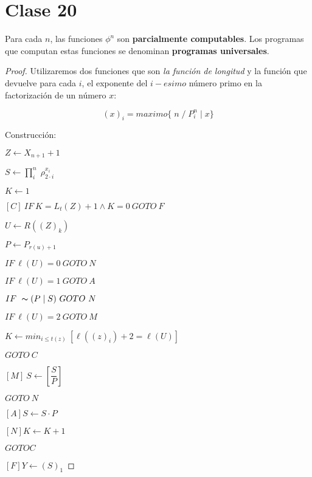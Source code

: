 \section{Clase 20}
 
\begin{theorem}
Para cada $n$, las funciones $\phi^n$ son \textbf{parcialmente computables}. Los programas que computan estas funciones se denominan \textbf{programas universales}.
\end{theorem}
 
\begin{proof}
Utilizaremos dos funciones que son \textit{la funci\'on de longitud} y la funci\'on que devuelve para cada $i$, el exponente del $i-esimo$ n\'umero primo en la factorizaci\'on de un n\'umero $x$:
 
\[
(x)_i = maximo \{ \; n \; / \; P_{i}^{n} \mid x \}
\]
 
Construcci\'on:
 
$Z \leftarrow X_{n + 1} + 1$
 
$S \leftarrow \prod_{i}^{n} \; \rho_{2 \cdot i}^{x_i}$
 
$K \leftarrow 1$
 
$[C]\ IF \ K = L_{t}(Z) + 1 \wedge K = 0 \ GOTO \ F$
 
$U \leftarrow R((Z)_{k})$
 
$P \leftarrow P_{r(u) + 1}$
 
$IF \ \ell(U) = 0 \ GOTO \ N$
 
$IF \ \ell(U) = 1 \ GOTO \ A$
 
$IF \ \thicksim(P \mid S) \ GOTO \ N$
 
$IF \ \ell(U) = 2 \ GOTO \ M$
 
$K \leftarrow min_{i \leq t(z)}\ [\ell((z)_i) + 2 = \ell(U)]$
 
$GOTO \ C$
 
$[M] \ S \leftarrow \left[\dfrac{S}{P}\right]$
 
$GOTO \ N$
 
$[A] S \leftarrow S \cdot P$
 
$[N] K \leftarrow K + 1$
 
$GOTO C$
 
$[F] Y \leftarrow (S)_{1}$
 
\end{proof}
 
